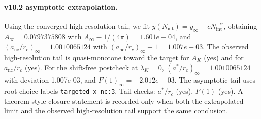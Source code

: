 \paragraph{v10.2 asymptotic extrapolation.}
Using the converged high-resolution tail, we fit $y(N_{\mathrm{int}})=y_{\infty}+cN_{\mathrm{int}}^{-\alpha}$, obtaining $A_\infty=0.0797375808$ with $A_\infty-1/(4\pi)=1.601e-04$, and $(a_{\mathrm{nc}}/r_c)_\infty=1.0010065124$ with $(a_{\mathrm{nc}}/r_c)_\infty-1=1.007e-03$. The observed high-resolution tail is quasi-monotone toward the target for $A_K$ (yes) and for $a_{\mathrm{nc}}/r_c$ (yes). For the shift-free postcheck at $\lambda_K=0$, $(a^*/r_c)_\infty=1.0010065124$ with deviation 1.007e-03, and $F(1)_\infty=-2.012e-03$. The asymptotic tail uses root-choice labels \texttt{targeted_x_nc:3}. Tail checks: $a^*/r_c$ (yes), $F(1)$ (yes). A theorem-style closure statement is recorded only when both the extrapolated limit and the
observed high-resolution tail support the same conclusion.

